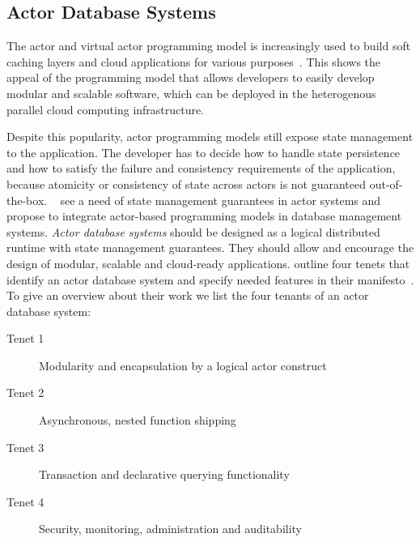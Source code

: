   \subsection{Actor Database Systems}
  The actor and virtual actor programming model is increasingly used to build soft caching layers and cloud applications for various purposes~\cite{erlang_uses,akka_uses,orleans_uses}.
  This shows the appeal of the programming model that allows developers to easily develop modular and scalable software, which can be deployed in the heterogenous parallel cloud computing infrastructure.
  
  Despite this popularity, actor programming models still expose state management to the application.
  The developer has to decide how to handle state persistence and how to satisfy the failure and consistency requirements of the application, because atomicity or consistency of state across actors is not guaranteed out-of-the-box.
  \citeauthor{manifesto}~\cite{manifesto} see a need of state management guarantees in actor systems and propose to integrate actor-based programming models in database management systems.
  \textit{Actor database systems} should be designed as a logical distributed runtime with state management guarantees.
  They should allow and encourage the design of modular, scalable and cloud-ready applications.
  \citeauthor{manifesto} outline four tenets that identify an actor database system and specify needed features in their manifesto~\cite{manifesto}.
  To give an overview about their work we list the four tenants of an actor database system:
  \begin{description}
    \item[Tenet 1] Modularity and encapsulation by a logical actor construct
    \item[Tenet 2] Asynchronous, nested function shipping
    \item[Tenet 3] Transaction and declarative querying functionality
    \item[Tenet 4] Security, monitoring, administration and auditability
  \end{description}
  
